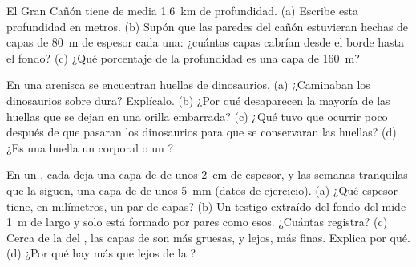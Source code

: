 \begin{exercise}[$\star\star$]\label{exo:g7:sediments-and-fossils:9}
El Gran Cañón tiene de media \qty{1.6}{km} de profundidad. (a) Escribe esta
profundidad en metros. (b) Supón que las paredes del cañón estuvieran
hechas de capas de \qty{80}{m} de espesor cada una: ¿cuántas capas cabrían
desde el borde hasta el fondo? (c) ¿Qué porcentaje de la profundidad es
una capa de \qty{160}{m}?
\end{exercise}

\begin{exercise}[$\star\star$]\label{exo:g7:sediments-and-fossils:10}
En una arenisca se encuentran huellas de dinosaurios. (a) ¿Caminaban los
dinosaurios sobre  dura? Explícalo. (b) ¿Por qué desaparecen la
mayoría de las huellas que se dejan en una orilla embarrada? (c) ¿Qué tuvo
que ocurrir poco después de que pasaran los dinosaurios para que se
conservaran las huellas? (d) ¿Es una huella un  corporal o un
?
\end{exercise}

\begin{exercise}[$\star\star\star$]\label{exo:g7:sediments-and-fossils:11}
En un , cada  deja una capa de  de unos \qty{2}{cm} de
espesor, y las semanas tranquilas que la siguen, una capa de  de unos
\qty{5}{mm} (datos de ejercicio). (a) ¿Qué espesor tiene, en milímetros,
un par de capas? (b) Un testigo extraído del fondo del  mide \qty{1}{m}
de largo y solo está formado por pares como esos. ¿Cuántas 
registra? (c) Cerca de la  del , las capas de  son
más gruesas, y lejos, más finas. Explica por qué. (d) ¿Por qué hay más
 que  lejos de la ?
\end{exercise}

